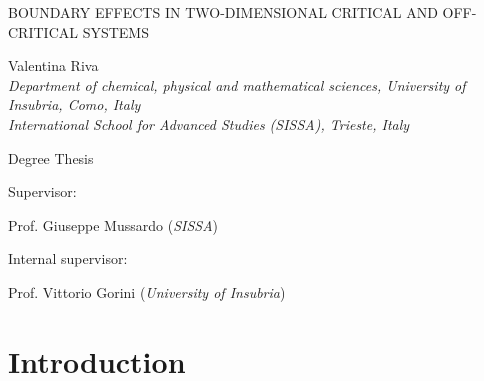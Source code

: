 \documentclass[a4paper,12pt]{report}
\begin{document}
\setcounter{page}{0} \topmargin 0pt \oddsidemargin 5mm
\renewcommand{\thefootnote}{\arabic{footnote}}
\newpage
\setcounter{page}{0}




\begin{titlepage}



\vspace{1cm}



\begin{center}\huge
BOUNDARY EFFECTS IN TWO-DIMENSIONAL CRITICAL AND OFF-CRITICAL SYSTEMS
\end{center}

\vspace{1cm}

\begin{center}
{\Large Valentina Riva\coordHE{}} \\
\vspace{0.5cm} {\em {}\coordHE{}Department of chemical, physical and mathematical sciences,
University of Insubria, Como, Italy}\\
\vspace{0.3cm} {\em {}\coordHE{}International School for Advanced Studies (SISSA), Trieste, Italy }
\end{center}

\vspace{2cm}

\begin{center}\Large
Degree Thesis
\end{center}

\vspace{1cm}


\begin{flushleft}\large
Supervisor:

Prof. Giuseppe Mussardo \quad (\textit{SISSA})

\vspace{0.5cm}

Internal supervisor:

Prof. Vittorio Gorini \quad (\textit{University of Insubria})
\end{flushleft}


\end{titlepage}



\tableofcontents

\newpage

\chapter{Introduction}
\end{document}
